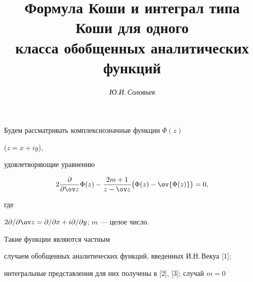 



\author{\it Ю.И.\,Соловьев}  




\title{Формула Коши и интеграл типа Коши для одного\\ 


класса обобщенных аналитических функций}  


  


\date{}  




  


\pagestyle{plain} %


  


  




  


\maketitle  


  


Будем рассматривать комплекснозначные функции $\Phi(z)$ 


($z=x+iy$), 


удовлетворяющие уравнению 


\begin{equation} 


2\frac{\partial}{\partial \ov z}\Phi(z)-\frac{2m+1}{z-\ov z} 


\bigl(\Phi(z)-\ov{\Phi(z)}\bigr)=0, 


\end{equation} 


где 


$2\partial/\partial\ov z=\partial/\partial x+ 


i\partial/\partial y$; $m$ --- целое число. 


Такие функции являются частным 


случаем обобщенных аналитических функций, введенных И.Н.\,Векуа [1]; 


интегральные представления для них получены в [2], [3]; случай $m=0$ 


